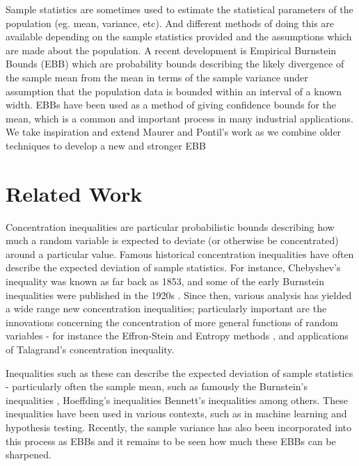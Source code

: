 \documentclass[aap,preprint]{imsart}
\begin{document}
Sample statistics are sometimes used to estimate the statistical parameters of the population (eg. mean, variance, etc).
And different methods of doing this are available depending on the sample statistics provided and the assumptions which are made about the population.
A recent development is Empirical Burnstein Bounds (EBB)\cite{Maurer50empiricalbernstein,10.1007/978-3-540-75225-7_15} which are probability bounds describing the likely divergence of the sample mean from the mean in terms of the sample variance under assumption that the population data is bounded within an interval of a known width.
EBBs have been used as a method of giving confidence bounds for the mean, which is a common and important process in many industrial applications.
We take inspiration and extend Maurer and Pontil's work \cite{Maurer50empiricalbernstein} as we combine older techniques to develop a new and stronger EBB

\section{Related Work}
Concentration inequalities are particular probabilistic bounds describing how much a random variable is expected to deviate (or otherwise be concentrated) around a particular value.
Famous historical concentration inequalities have often describe the expected deviation of sample statistics.
For instance, Chebyshev's inequality was known as far back as 1853\cite{Chebyshev1}, and some of the early Burnstein inequalities were published in the 1920s \cite{burnstein1}.
Since then, various analysis has yielded a wide range new concentration inequalities\cite{MR3363542,Boucheron2004}; particularly important are the innovations concerning the concentration of more general functions of random variables - for instance the Effron-Stein\cite{efron1981} and Entropy methods \cite{Boucheron_concentrationinequalities}, and applications of Talagrand's concentration inequality\cite{Talagrand1995}.

Inequalities such as these can describe the expected deviation of sample statistics - particularly often the sample mean, such as famously the Burnstein's inequalities \cite{burnstein1}, Hoeffding's inequalities \cite{hoeffding1} Bennett's inequalities \cite{10.2307/2282438} among others.
These inequalities have been used in various contexts, such as in machine learning and hypothesis testing.\cite{Maron1997,Mnih:2008:EBS:1390156.1390241,8000571,Zia-UrRehman2012,DBLP:conf/aaai/ThomasTG15,Maurer50empiricalbernstein}
Recently, the sample variance has also been incorporated into this process as EBBs \cite{Maurer50empiricalbernstein,10.1007/978-3-540-75225-7_15} and it remains to be seen how much these EBBs can be sharpened.
\end{document}
